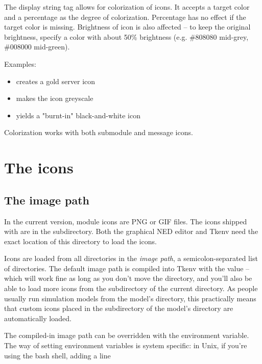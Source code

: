 The  display string tag allows for colorization of icons.
It accepts a target color and a percentage as the degree of colorization.
Percentage has no effect if the target color is missing.
Brightness of icon is also affected -- to keep the original brightness,
specify a color with about 50\% brightness (e.g. \#808080 mid-grey,
\#008000 mid-green).

Examples:

\begin{itemize}
  \item {} creates a gold server icon
  \item {} makes the icon greyscale
  \item {} yields a "burnt-in" black-and-white icon
\end{itemize}

Colorization works with both submodule and message icons.


\section{The icons}
\label{sec:ch-graphics:icon-library}

\subsection{The image path}

In the current {\opp} version, module icons are PNG or GIF files. The icons shipped
with {\opp} are in the  subdirectory. Both the graphical NED editor
and Tkenv need the exact location of this directory to load the icons.

Icons are loaded from all directories in the \textit{image path},
a semicolon-separated list of directories.
The default image path is compiled into Tkenv with the value
 -- which will work fine
as long as you don't move the directory, and you'll also be able to
load more icons from the  subdirectory of the current
directory. As people usually run simulation models from the model's
directory, this practically means that custom icons placed in the
 subdirectory of the model's directory are automatically
loaded.

The compiled-in image path can be overridden with the 
environment variable. The way of setting environment variables is system
specific: in Unix, if you're using the bash shell, adding a line

